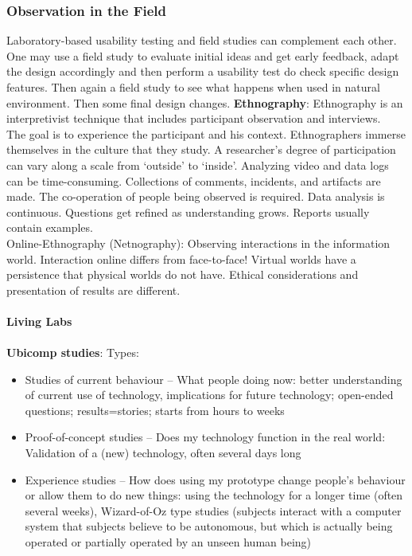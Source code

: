 \subsubsection{Observation in the Field}
Laboratory-based usability testing and field studies can complement each other. One may use a field study to evaluate initial ideas and get early feedback, adapt the design accordingly and then perform a usability test do check specific design features. Then again a field study to see what happens when used in natural environment. Then some final design changes. 
\textbf{Ethnography}:
Ethnography is an interpretivist technique that includes participant observation and interviews.\\
The goal is to experience the participant and his context. Ethnographers immerse themselves in the culture that they study. A researcher's degree of participation can vary along a scale
from `outside' to `inside'. Analyzing video and data logs can be time-consuming. Collections of comments, incidents, and artifacts are made.
The co-operation of people being observed is required. Data analysis is continuous. Questions get refined as understanding grows. Reports usually contain examples.\\
Online-Ethnography (Netnography): Observing interactions in the information world. Interaction online differs from face-to-face! Virtual worlds have a persistence that physical worlds do not have. Ethical considerations and presentation of results are different.\\\\
\textbf{Living Labs}\\\\
\textbf{Ubicomp studies}: Types:
\begin{itemize}
\item Studies of current behaviour -- What people doing now: better understanding of current use of technology, implications for future technology; open-ended questions; results=stories; starts from hours to weeks
\item Proof-of-concept studies -- Does my technology function in the real world: Validation of a (new) technology, often several days long
\item Experience studies -- How does using my prototype change people's behaviour or allow them to do new things: using the technology for a longer time (often several weeks), Wizard-of-Oz type studies (subjects interact with a computer system that subjects believe to be autonomous, but which is actually being operated or partially operated by an unseen human being)
\end{itemize}
